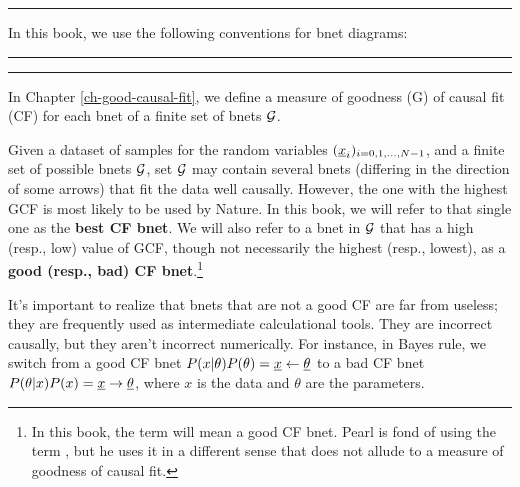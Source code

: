\hrule
In this book,
we use the following conventions
for bnet diagrams:

\bnetInstantiations

\hrule
\hiddenNodes

\hrule
In  Chapter \ref{ch-good-causal-fit},
we define a measure
of goodness (G) of causal fit (CF)
for each bnet of a finite set of bnets ${\cal G}$.

Given a dataset of samples for
the random variables
$(\rvx_i)_{i=0, 1, \ldots, N-1}$,
and a finite set of possible bnets ${\cal G}$,
set ${\cal G}$ may contain
several bnets (differing
in the direction
of some arrows) that
fit the data well causally. However,
the one with the highest
GCF is most likely to be used
by Nature.
In this book, we will refer to that
single one as the
{\bf best CF bnet}.
We will also refer to
a bnet in ${\cal G}$ that has a high (resp., low) value
of GCF, though not
necessarily the highest (resp., lowest),
as a {\bf good (resp., bad) CF bnet}.\footnote{
In  this book, the term 
will mean a good CF bnet. Pearl is fond
of using the term ,
but he uses it in a different
sense that does not
allude to a measure of goodness of causal fit.}

It's important to realize
that bnets that are not a good CF
are far from useless; they
are frequently used
as intermediate calculational
tools. They are incorrect causally,
but they aren't incorrect numerically.
For instance, in Bayes rule,
we switch from a good CF bnet
$P(x|\theta)P(\theta)=\rvx\larrow\ul{\theta}$
to a bad CF bnet
$P(\theta|x)P(x)=\rvx\rarrow\ul{\theta}$,
where $x$ is the data
and $\theta$ are the parameters.
